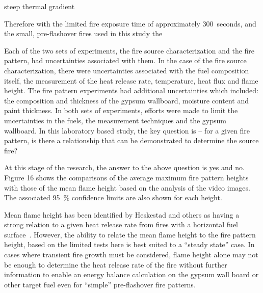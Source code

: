 \documentclass[twoside]{uocthesis}
\begin{document}
{steep thermal gradient


Therefore with the limited fire exposure time of approximately 300~seconds, and the small, pre-flashover fires used in this study the     



Each of the two sets of experiments, the fire source characterization and the fire pattern, had uncertainties associated with them.  In the case of the fire source characterization, there were uncertainties associated with the fuel composition itself, the measurement of the heat release rate, temperature, heat flux and flame height.  The fire pattern experiments had additional uncertainties which included: the composition and thickness of the gypsum wallboard, moisture content and paint thickness.  In both sets of experiments, efforts were made to limit the uncertainties in the fuels, the measurement techniques and the gypsum wallboard. In this laboratory based study, the key question is – for a given fire pattern, is there a relationship that can be demonstrated to determine the source fire?

At this stage of the research, the answer to the above question is yes and no.  Figure 16 shows the comparisons of the average maximum fire pattern heights with those of the mean flame height based on the analysis of the video images.  The associated 95~\% confidence limits are also shown for each height.  
         
Mean flame height has been identified by Heskestad and others as having a strong relation to a given heat release rate from fires with a horizontal fuel surface~\cite{Heskestad:SFPE, Beyler:1986}.  However, the ability to relate the mean flame height to the fire pattern height, based on the limited tests here is best suited to a “steady state” case.  In cases where transient fire growth must be considered, flame height alone may not be enough to determine the heat release rate of the fire without further information to enable an energy balance calculation on the gypsum wall board or other target fuel even for “simple” pre-flashover fire patterns.

}
\end{document}
